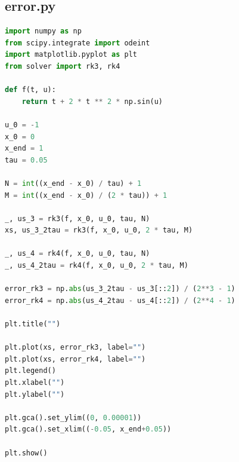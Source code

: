 \documentclass[11pt]{article}
\begin{document}
\newpage
\subsection{error.py}

\begin{lstlisting}[language=Python]
import numpy as np
from scipy.integrate import odeint
import matplotlib.pyplot as plt
from solver import rk3, rk4

def f(t, u):
    return t + 2 * t ** 2 * np.sin(u)

u_0 = -1
x_0 = 0
x_end = 1
tau = 0.05

N = int((x_end - x_0) / tau) + 1
M = int((x_end - x_0) / (2 * tau)) + 1

_, us_3 = rk3(f, x_0, u_0, tau, N)
xs, us_3_2tau = rk3(f, x_0, u_0, 2 * tau, M)

_, us_4 = rk4(f, x_0, u_0, tau, N)
_, us_4_2tau = rk4(f, x_0, u_0, 2 * tau, M)

error_rk3 = np.abs(us_3_2tau - us_3[::2]) / (2**3 - 1)
error_rk4 = np.abs(us_4_2tau - us_4[::2]) / (2**4 - 1)

plt.title("")

plt.plot(xs, error_rk3, label="")
plt.plot(xs, error_rk4, label="")
plt.legend()
plt.xlabel("")
plt.ylabel("")

plt.gca().set_ylim((0, 0.00001))
plt.gca().set_xlim((-0.05, x_end+0.05))

plt.show()
\end{lstlisting}
\end{document}
